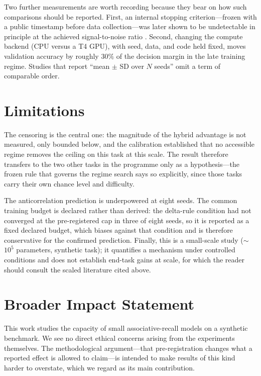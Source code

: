 \documentclass{article}
\begin{document}
Two further measurements are worth recording because they bear on how such comparisons should
be reported. First, an internal stopping criterion---frozen with a public timestamp before data
collection---was later shown to be undetectable in principle at the achieved signal-to-noise
ratio \citep{speranza2026stopping}. Second, changing the compute backend (CPU versus a T4
GPU), with seed, data, and code held fixed, moves validation accuracy by roughly $30\%$ of the
decision margin in the late training regime. Studies that report ``mean $\pm$ SD over $N$
seeds'' omit a term of comparable order.

\section{Limitations}

The censoring is the central one: the magnitude of the hybrid advantage is not measured, only
bounded below, and the calibration established that no accessible regime removes the ceiling on
this task at this scale. The result therefore transfers to the two other tasks in the programme
only as a hypothesis---the frozen rule that governs the regime search says so explicitly, since
those tasks carry their own chance level and difficulty.

The anticorrelation prediction is underpowered at eight seeds. The common training budget is
declared rather than derived: the delta-rule condition had not converged at the pre-registered
cap in three of eight seeds, so it is reported as a fixed declared budget, which biases against
that condition and is therefore conservative for the confirmed prediction. Finally, this is a
small-scale study ($\sim$$10^5$ parameters, synthetic task); it quantifies a mechanism under
controlled conditions and does not establish end-task gains at scale, for which the reader
should consult the scaled literature cited above.

\section*{Broader Impact Statement}

This work studies the capacity of small associative-recall models on a synthetic benchmark. We
see no direct ethical concerns arising from the experiments themselves. The methodological
argument---that pre-registration changes what a reported effect is allowed to claim---is
intended to make results of this kind harder to overstate, which we regard as its main
contribution.
\end{document}
